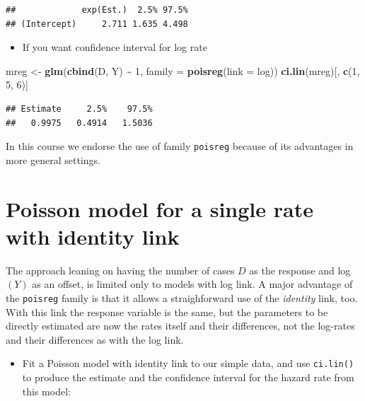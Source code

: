 \documentclass[
]{book}
\newenvironment{Shaded}{\begin{snugshade}}{\end{snugshade}}
\newcommand{\AttributeTok}[1]{\textcolor[rgb]{0.13,0.29,0.53}{#1}}
\newcommand{\DecValTok}[1]{\textcolor[rgb]{0.00,0.00,0.81}{#1}}
\newcommand{\FunctionTok}[1]{\textcolor[rgb]{0.13,0.29,0.53}{\textbf{#1}}}
\newcommand{\NormalTok}[1]{#1}
\newcommand{\OtherTok}[1]{\textcolor[rgb]{0.56,0.35,0.01}{#1}}
\newcommand{\SpecialCharTok}[1]{\textcolor[rgb]{0.81,0.36,0.00}{\textbf{#1}}}
\providecommand{\tightlist}{%
  \setlength{\itemsep}{0pt}\setlength{\parskip}{0pt}}
\theoremstyle{definition}
\theoremstyle{definition}
\theoremstyle{definition}
\theoremstyle{definition}
\theoremstyle{remark}
\begin{document}
\begin{verbatim}
##             exp(Est.)  2.5% 97.5%
## (Intercept)     2.711 1.635 4.498
\end{verbatim}

\begin{itemize}
\tightlist
\item
  If you want confidence interval for log rate
\end{itemize}

\begin{Shaded}
\begin{Highlighting}[]
\NormalTok{mreg }\OtherTok{\textless{}{-}} \FunctionTok{glm}\NormalTok{(}\FunctionTok{cbind}\NormalTok{(D, Y) }\SpecialCharTok{\textasciitilde{}} \DecValTok{1}\NormalTok{, }\AttributeTok{family =} \FunctionTok{poisreg}\NormalTok{(}\AttributeTok{link =}\NormalTok{ log))}
\FunctionTok{ci.lin}\NormalTok{(mreg)[, }\FunctionTok{c}\NormalTok{(}\DecValTok{1}\NormalTok{, }\DecValTok{5}\NormalTok{, }\DecValTok{6}\NormalTok{)]}
\end{Highlighting}
\end{Shaded}

\begin{verbatim}
## Estimate     2.5%    97.5% 
##   0.9975   0.4914   1.5036
\end{verbatim}

In this course we endorse the use of family \texttt{poisreg} because of its advantages in more general settings.

\section{Poisson model for a single rate with identity link}\label{poisson-model-for-a-single-rate-with-identity-link}

The approach leaning on having the number of cases \(D\) as the response and log\((Y)\) as an offset,
is limited only to models with log link. A major advantage of the \texttt{poisreg} family is that it allows
a straighforward use of the \emph{identity} link, too. With this link the response variable is the same, but
the parameters to be directly estimated are now the rates itself and their differences, not the log-rates
and their differences as with the log link.

\begin{itemize}
\tightlist
\item
  Fit a Poisson model with identity link to our simple data, and
  use \texttt{ci.lin()} to produce the estimate and the
  confidence interval for the hazard rate from this model:
\end{itemize}
\end{document}

